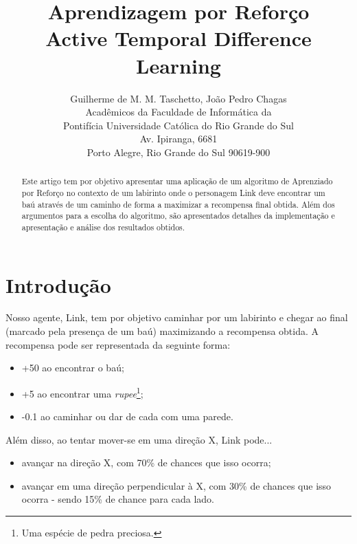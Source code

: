 \documentclass[letterpaper]{article}
\begin{document}
\title{Aprendizagem por Reforço\\Active Temporal Difference Learning}
\author{Guilherme de M. M. Taschetto, João Pedro Chagas\\
Acadêmicos da Faculdade de Informática da\\
Pontifícia Universidade Católica do Rio Grande do Sul\\
Av. Ipiranga, 6681\\
Porto Alegre, Rio Grande do Sul 90619-900}

\maketitle
\begin{abstract}
Este artigo tem por objetivo apresentar uma aplicação de um algoritmo de Aprenziado por Reforço
no contexto de um labirinto onde o personagem Link deve encontrar um baú através de um caminho
de forma a maximizar a recompensa final obtida. Além dos argumentos para a escolha do algoritmo,
são apresentados detalhes da implementação e apresentação e análise dos resultados obtidos.
\end{abstract}

\section{Introdução}

Nosso agente, Link, tem por objetivo caminhar por um labirinto e chegar ao final (marcado pela
presença de um baú) maximizando a recompensa obtida. A recompensa pode ser representada da
seguinte forma:

\begin{itemize}
\item +50 ao encontrar o baú;
\item +5 ao encontrar uma \textit{rupee}\footnote{Uma espécie de pedra preciosa.};
\item -0.1 ao caminhar ou dar de cada com uma parede.
\end{itemize}

Além disso, ao tentar mover-se em uma direção X, Link pode...

\begin{itemize}
\item avançar na direção X, com 70\% de chances que isso ocorra;
\item avançar em uma direção perpendicular à X, com 30\% de chances que isso ocorra - sendo 15\%
de chance para cada lado.
\end{itemize}
\end{document}
